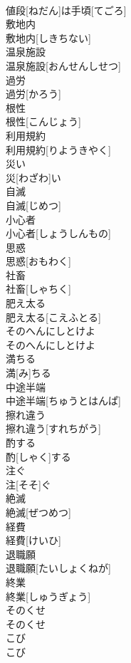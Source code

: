 \documentclass[8pt]{extreport}
\begin{document}
\begin{CJK}{UTF8}{min}
\\	値段[ねだん]は手頃[てごろ]	
\\	敷地内	
\\	敷地内[しきちない]	
\\	温泉施設	
\\	温泉施設[おんせんしせつ]	
\\	過労	
\\	過労[かろう]	
\\	根性	
\\	根性[こんじょう]	
\\	利用規約	
\\	利用規約[りようきやく]	
\\	災い	
\\	災[わざわ]い	
\\	自滅	
\\	自滅[じめつ]	
\\	小心者	
\\	小心者[しょうしんもの]	
\\	思惑	
\\	思惑[おもわく]	
\\	社畜	
\\	社畜[しゃちく]	
\\	肥え太る	
\\	肥え太る[こえふとる]	
\\	そのへんにしとけよ	
\\	そのへんにしとけよ	
\\	満ちる	
\\	満[み]ちる	
\\	中途半端	
\\	中途半端[ちゅうとはんぱ]	
\\	擦れ違う	
\\	擦れ違う[すれちがう]	
\\	酌する	
\\	酌[しゃく]する	
\\	注ぐ	
\\	注[そそ]ぐ	
\\	絶滅	
\\	絶滅[ぜつめつ]	
\\	経費	
\\	経費[けいひ]	
\\	退職願	
\\	退職願[たいしょくねが]	
\\	終業	
\\	終業[しゅうぎょう]	
\\	そのくせ	
\\	そのくせ	
\\	こび	
\\	こび	

\end{CJK}
\end{document}
